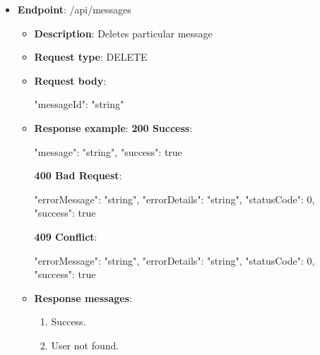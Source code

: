 \begin{itemize}
    \item \textbf{Endpoint}: /api/messages
    \begin{itemize}
        \item \textbf{Description}: Deletes particular message
        \item \textbf{Request type}: DELETE
        \item \textbf{Request body}:
        \begin{spverbatim}
        {
            "messageId": "string"
        }
        \end{spverbatim}
        \item \textbf{Response example}:
        \textbf{200 Success}:
        \begin{spverbatim}
        {
            "message": "string",
            "success": true
        }
        \end{spverbatim}
        \textbf{400 Bad Request}:
        \begin{spverbatim}
        {
            "errorMessage": "string",
            "errorDetails": "string",
            "statusCode": 0,
            "success": true
        }
        \end{spverbatim}
        \textbf{409 Conflict}:
        \begin{spverbatim}
        {
            "errorMessage": "string",
            "errorDetails": "string",
            "statusCode": 0,
            "success": true
        }
        \end{spverbatim}
        \item \textbf{Response messages}:
        \begin{enumerate}
            \item Success.
            \item User not found.
        \end{enumerate}
    \end{itemize}
\end{itemize}


